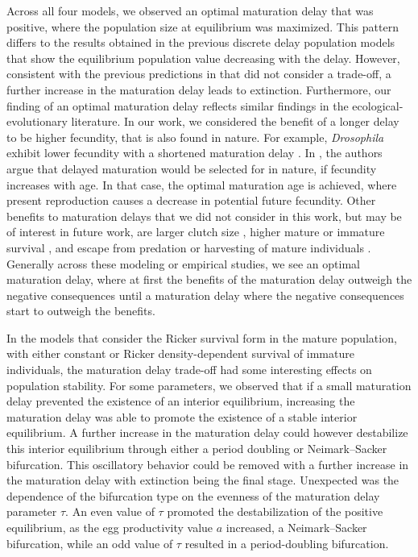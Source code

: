 \documentclass{article}
\numberwithin{theorem}{section}
\begin{document}
{Across all four models, we observed an optimal maturation delay that was positive, where the population size at equilibrium was maximized. This pattern differs to the results obtained in the previous discrete delay population models \cite{StWodelay2, StWodelay3} that show the equilibrium population value decreasing with the delay. However, consistent with the previous predictions in \cite{StWodelay2, StWodelay3} that did not consider a trade-off, a further increase in the maturation delay leads to extinction. Furthermore, our finding of an optimal maturation delay reflects similar findings in the ecological-evolutionary literature. In our work, we considered the benefit of a longer delay to be higher fecundity, that is also found in nature. For example, \textit{Drosophila} exhibit lower fecundity with a shortened maturation delay  \cite{chippindaleExperimentalEvolutionAccelerated1997}. In \cite{bellCostsReproductionTheir1980}, the authors argue that delayed maturation would be selected for in nature, if fecundity increases with age. In that case, the optimal maturation age is achieved, where present reproduction causes a decrease in potential future fecundity. Other benefits to maturation delays that we did not consider in this work, but may be of interest in future work, are larger clutch size \cite{fordExperimentalStudyTradeOffs1994a}, higher mature or immature survival \cite{zeraPhysiologyLifeHistory2001a}, and escape from predation or harvesting of mature individuals \cite{poosHarvestinducedMaturationEvolution2011}. Generally across these modeling or empirical studies, we see an optimal maturation delay, where at first the benefits of the maturation delay outweigh the negative consequences until a maturation delay where the negative consequences start to outweigh the benefits.

In the models that consider the Ricker survival form in the mature population, with either constant or Ricker density-dependent survival of immature individuals, the maturation delay trade-off had some interesting effects on population stability. For some parameters, we observed that if a small maturation delay prevented the existence of an interior equilibrium, increasing the maturation delay was able to promote the existence of a stable interior equilibrium. A further increase in the maturation delay could however destabilize this interior equilibrium through either a period doubling or Neimark--Sacker bifurcation. This oscillatory behavior could be removed with a further increase in the maturation delay with extinction being the final stage. Unexpected was the dependence of the bifurcation type on the evenness of the maturation delay parameter $\tau$. An even value of $\tau$ promoted the destabilization of the positive equilibrium, as the egg productivity value $a$ increased, a Neimark--Sacker bifurcation, while an odd value of $\tau$ resulted in a period-doubling bifurcation. 

}
\end{document}
